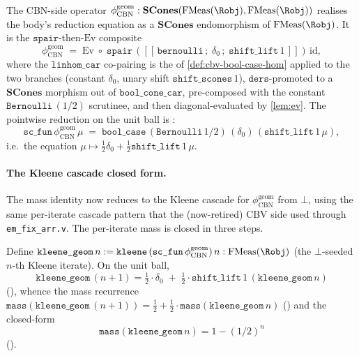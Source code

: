 \begin{definition}\label{def:phi-cbn-geom}
\rocqok
{}\rocqok
{}
The CBN-side operator
$\phi_{\mathrm{CBN}}^{\mathrm{geom}} :
\mathbf{SCones}(\FMeas(\Robj),\FMeas(\Robj))$ realises the body's
reduction equation as a $\mathbf{SCones}$ endomorphism of
$\FMeas(\Robj)$. It is the
$\texttt{spair}$-then-$\mathrm{Ev}$ composite
\[
  \phi_{\mathrm{CBN}}^{\mathrm{geom}} \;=\;
  \mathrm{Ev} \;\circ\; \texttt{spair}\,(
    [\![\,\texttt{bernoulli}\,;\;\delta_0\,;\;\texttt{shift\_lift}\,1\,]\!]
  )\,\mathrm{id},
\]
where the $\texttt{linhom\_car}$ co-pairing
 is the
 of
\autoref{def:cbv-bool-case-hom} applied to the two branches
(constant $\delta_0$, unary shift $\texttt{shift\_scones}\,1$),
$\texttt{ders}$-promoted to a $\mathbf{SCones}$ morphism out of
$\mathtt{bool\_cone\_car}$, pre-composed with the constant
$\texttt{Bernoulli}\,(1/2)$ scrutinee, and then diagonal-evaluated by
\autoref{lem:ev}. The pointwise reduction on the unit ball is
:
\[
  \texttt{sc\_fun}\,\phi_{\mathrm{CBN}}^{\mathrm{geom}}\,\mu
  \;=\;
  \texttt{bool\_case}\,(\mathtt{Bernoulli}\,1/2)\,
    (\delta_0)\,(\texttt{shift\_lift}\,1\,\mu),
\]
i.e.\ the equation $\mu \mapsto \tfrac{1}{2}\delta_0 +
\tfrac{1}{2}\texttt{shift\_lift}\,1\,\mu$.
\end{definition}

\paragraph{The Kleene cascade closed form.}
The mass identity now reduces to the Kleene cascade for
$\phi_{\mathrm{CBN}}^{\mathrm{geom}}$ from $\bot$, using the same
per-iterate cascade pattern that the (now-retired) CBV side used
through \texttt{em\_fix\_arr.v}. The per-iterate mass is closed in
three steps.

\begin{lemma}\label{lem:cbn-kleene-cascade}
\rocqok
{}\rocqok
{}\rocqok
{}
Define $\texttt{kleene\_geom}\,n := \texttt{kleene}\,(\texttt{sc\_fun}\,
\phi_{\mathrm{CBN}}^{\mathrm{geom}})\,n : \FMeas(\Robj)$ (the
$\bot$-seeded $n$-th Kleene iterate). On the unit ball,
\[
  \texttt{kleene\_geom}\,(n+1) =
  \tfrac{1}{2}\cdot \delta_0 \;+\;
  \tfrac{1}{2}\cdot \texttt{shift\_lift}\,1\,(\texttt{kleene\_geom}\,n)
\]
(), whence the mass
recurrence
$\texttt{mass}(\texttt{kleene\_geom}\,(n+1)) =
\tfrac{1}{2} + \tfrac{1}{2}\cdot
\texttt{mass}(\texttt{kleene\_geom}\,n)$
() and the
closed-form
\[
  \texttt{mass}(\texttt{kleene\_geom}\,n) = 1 - (1/2)^n
\]
().
\end{lemma}

